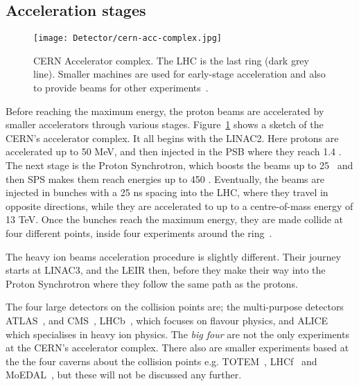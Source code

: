 		\subsection*{Acceleration stages}

			\begin{figure}[!htb]
				\texttt{[image: Detector/cern-acc-complex.jpg]}
				\caption{\ac{CERN} Accelerator complex. The \ac{LHC} is the last ring (dark grey line). Smaller machines are used for early-stage acceleration and also to provide beams for other experiments~\cite{Lefevre2008}.}
				\label{fig:cern-acc-complex}
			\end{figure}

			Before reaching the maximum energy, the proton beams are accelerated by smaller accelerators through various stages. Figure~\ref{fig:cern-acc-complex} shows a sketch of the \ac{CERN}'s accelerator complex. It all begins with the \ac{LINAC2}. Here protons are accelerated up to 50 MeV, and then injected in the \ac{PSB} where they reach 1.4 \GeV. The next stage is the Proton Synchrotron, which boosts the beams up to 25 \GeV\, and then \ac{SPS} makes them reach energies up to 450 \GeV. Eventually, the beams are injected in bunches with a 25 ns spacing into the \ac{LHC}, where they travel in opposite directions, while they are accelerated to up to a centre-of-mass energy of 13 TeV. Once the bunches reach the maximum energy, they are made collide at four different points, inside four experiments around the ring~\cite{LHCDesignReport}. 

			The heavy ion beams acceleration procedure is slightly different. Their journey starts at \ac{LINAC3}, and the \ac{LEIR} then, before they make their way into the Proton Synchrotron where they follow the same path as the protons. 

			The four large detectors on the collision points are; the multi-purpose detectors \ac{ATLAS}~\cite{ATLASJINST}, and \ac{CMS}~\cite{CMSJINST}, \ac{LHCb}~\cite{LHCb2008}, which focuses on flavour physics, and \ac{ALICE}~\cite{ALICEJINST} which specialises in heavy ion physics. The \emph{big four} are not the only experiments at the \ac{CERN}'s accelerator complex. There also are smaller experiments based at the the four caverns about the collision points e.g. \ac{TOTEM}~\cite{1748-0221-3-08-S08007}, \ac{LHCf}~\cite{Adriani:926196} and \ac{MoEDAL}~\cite{Pinfold:2017dot}, but these will not be discussed any further.
		


